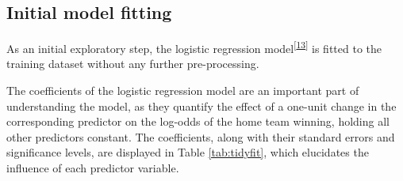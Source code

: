 \documentclass[
  12pt,
  a4paper,
]{article}
\begin{document}
\hypertarget{initial-model-fitting}{%
\subsection{Initial model fitting}\label{initial-model-fitting}}

As an initial exploratory step, the logistic regression model\textsuperscript{{[}\protect\hyperlink{ref-glm}{13}{]}} is fitted to the training dataset without any further pre-processing.

The coefficients of the logistic regression model are an important part of understanding the model, as they quantify the effect of a one-unit change in the corresponding predictor on the log-odds of the home team winning, holding all other predictors constant. The coefficients, along with their standard errors and significance levels, are displayed in Table \ref{tab:tidyfit}, which elucidates the influence of each predictor variable.
\end{document}
